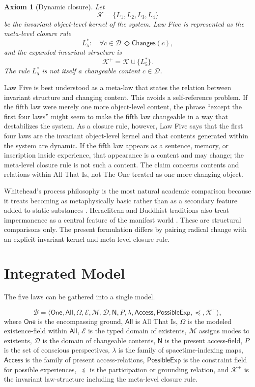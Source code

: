 \documentclass[11pt]{article}
\newtheorem{axiom}{Axiom}
\newcommand{\Now}{\mathsf{N}}
\newcommand{\One}{\mathsf{One}}
\newcommand{\All}{\mathsf{All}}
\newcommand{\Ent}{\mathcal{E}}
\newcommand{\Modes}{\mathcal{M}}
\newcommand{\Contents}{\mathcal{D}}
\newcommand{\Access}{\mathsf{Access}}
\newcommand{\PossExp}{\mathsf{PossibleExp}}
\newcommand{\Changes}{\mathsf{Changes}}
\newcommand{\Ground}{\preceq}
\newcommand{\Kernel}{\mathcal{K}}
\newcommand{\MetaFive}{L_5^{\ast}}
\begin{document}
\begin{axiom}[Dynamic closure]
Let
\[
\Kernel=\{L_1,L_2,L_3,L_4\}
\]
be the invariant object-level kernel of the system.  Law Five is represented as the meta-level closure rule
\[
\MetaFive:\quad \forall c\in\Contents\,\Diamond\Changes(c),
\]
and the expanded invariant structure is
\[
\Kernel^+=\Kernel\cup\{\MetaFive\}.
\]
The rule $\MetaFive$ is not itself a changeable content $c\in\Contents$.
\end{axiom}

Law Five is best understood as a meta-law that states the relation between invariant structure and changing content.  This avoids a self-reference problem.  If the fifth law were merely one more object-level content, the phrase ``except the first four laws'' might seem to make the fifth law changeable in a way that destabilizes the system.  As a closure rule, however, Law Five says that the first four laws are the invariant object-level kernel and that contents generated within the system are dynamic.  If the fifth law appears as a sentence, memory, or inscription inside experience, that appearance is a content and may change; the meta-level closure rule is not such a content.  The claim concerns contents and relations within All That Is, not The One treated as one more changing object.

Whitehead's process philosophy is the most natural academic comparison because it treats becoming as metaphysically basic rather than as a secondary feature added to static substances \cite{Whitehead1978}.  Heraclitean and Buddhist traditions also treat impermanence as a central feature of the manifest world \cite{Kahn1979,Gethin1998}.  These are structural comparisons only.  The present formulation differs by pairing radical change with an explicit invariant kernel and meta-level closure rule.

\section{Integrated Model}

The five laws can be gathered into a single model.

\[
\mathcal{B}=\langle \One,\All,\Omega,\Ent,\Modes,\Contents,\Now,P,\lambda,\Access,\PossExp,\Ground,\Kernel^+\rangle,
\]
where $\One$ is the encompassing ground, $\All$ is All That Is, $\Omega$ is the modeled existence-field within $\All$, $\Ent$ is the typed domain of existents, $\Modes$ assigns modes to existents, $\Contents$ is the domain of changeable contents, $\Now$ is the present access-field, $P$ is the set of conscious perspectives, $\lambda$ is the family of spacetime-indexing maps, $\Access$ is the family of present access-relations, $\PossExp$ is the constraint field for possible experiences, $\Ground$ is the participation or grounding relation, and $\Kernel^+$ is the invariant law-structure including the meta-level closure rule.
\end{document}
